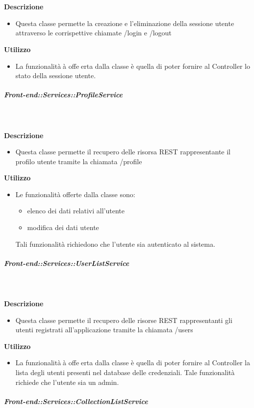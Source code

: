         \textbf{\\ \\ Descrizione} 
          \begin{itemize}
            \item[] Questa classe permette la creazione e l'eliminazione della sessione utente attraverso le corrispettive chiamate /login e /logout
          \end{itemize}      
        \textbf{Utilizzo}  
          \begin{itemize}
            \item[] La funzionalitàà offeerta dalla classe è quella di poter fornire al Controller lo stato della sessione utente.
          \end{itemize}
      \subparagraph{Front-end::Services::ProfileService}
        
        \textbf{\\ \\ Descrizione} 
          \begin{itemize}
            \item[] Questa classe permette il recupero delle risorsa REST rappresentante il profilo utente tramite la chiamata /profile
          \end{itemize}      
        \textbf{Utilizzo}  
          \begin{itemize}
            \item[] Le funzionalità offerte dalla classe sono:
\begin{itemize}
\item elenco dei dati relativi all'utente
\item modifica dei dati utente
\end{itemize}

Tali funzionalità richiedono che l'utente sia autenticato al sistema.
          \end{itemize}
      \subparagraph{Front-end::Services::UserListService}
        
        \textbf{\\ \\ Descrizione} 
          \begin{itemize}
            \item[] Questa classe permette il recupero delle risorse REST rappresentanti gli utenti registrati all'applicazione tramite la chiamata /users
          \end{itemize}      
        \textbf{Utilizzo}  
          \begin{itemize}
            \item[] La funzionalitàà offeerta dalla classe è quella di poter fornire al Controller la lista degli utenti presenti nel database delle credenziali.
Tale funzionalità richiede che l'utente sia un admin.
          \end{itemize}
      \subparagraph{Front-end::Services::CollectionListService}
        

